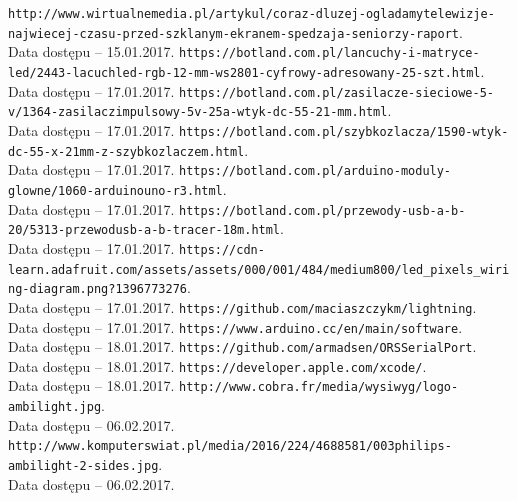 \documentclass[12pt]{report}
\begin{document}
\begin{thebibliography}{99}
 {\tt http://www.wirtualnemedia.pl/artykul/coraz-dluzej-ogladamy\-telewizje-najwiecej-czasu-przed-szklanym-ekranem-spedzaja\--seniorzy-raport}.\\Data dostępu -- 15.01.2017.
 {\tt https://botland.com.pl/lancuchy-i-matryce-led/2443-lacuch\-led-rgb-12-mm-ws2801-cyfrowy-adresowany-25-szt.html}.\\Data dostępu -- 17.01.2017.
 {\tt https://botland.com.pl/zasilacze-sieciowe-5-v/1364-zasilacz\-impulsowy-5v-25a-wtyk-dc-55-21-mm.html}.\\Data dostępu -- 17.01.2017.
 {\tt https://botland.com.pl/szybkozlacza/1590-wtyk-dc-55-x-21\-mm-z-szybkozlaczem.html}.\\Data dostępu -- 17.01.2017.
 {\tt https://botland.com.pl/arduino-moduly-glowne/1060-arduino\-uno-r3.html}.\\Data dostępu -- 17.01.2017.
 {\tt https://botland.com.pl/przewody-usb-a-b-20/5313-przewod\-usb-a-b-tracer-18m.html}.\\Data dostępu -- 17.01.2017.
 {\tt https://cdn-learn.adafruit.com/assets/assets/000/001/484/\-medium800/led\_pixels\_wiring-diagram.png?1396773276}.\\Data dostępu -- 17.01.2017.
 {\tt https://github.com/maciaszczykm/lightning}.\\Data dostępu -- 17.01.2017.
 {\tt https://www.arduino.cc/en/main/software}.\\Data dostępu -- 18.01.2017.
 {\tt https://github.com/armadsen/ORSSerialPort}.\\Data dostępu -- 18.01.2017.
 {\tt https://developer.apple.com/xcode/}.\\Data dostępu -- 18.01.2017.
 {\tt http://www.cobra.fr/media/wysiwyg/logo-ambilight.jpg}. \\Data dostępu -- 06.02.2017.
 {\tt http://www.komputerswiat.pl/media/2016/224/4688581/003\-philips-ambilight-2-sides.jpg}. \\Data dostępu -- 06.02.2017.
\end{thebibliography}

\listoffigures

\listoftables

\lstlistoflistings
\end{document}
